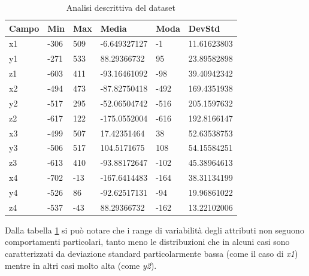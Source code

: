 \documentclass[12pt]{article}
\begin{document}
\begin{table}[h]
	\caption{Analisi descrittiva del dataset}\label{tab:analytics}
	\begin{tabular}{|l|l|l|l|l|l|}
		\hline
		Campo & Min & Max & Media & Moda & DevStd \\
		\hline
		x1 & -306 & 509 & -6.649327127 & -1 & 11.61623803 \\
		y1 & -271 & 533 & 88.29366732 & 95 & 23.89582898 \\
		z1 & -603 & 411 & -93.16461092 & -98 & 39.40942342 \\
		x2 & -494 & 473 & -87.82750418 & -492 & 169.4351938 \\
		y2 & -517 & 295 & -52.06504742 & -516 & 205.1597632 \\
		z2 & -617 & 122 & -175.0552004 & -616 & 192.8166147 \\
		x3 & -499 & 507 & 17.42351464 & 38 & 52.63538753 \\
		y3 & -506 & 517 & 104.5171675 & 108 & 54.15584251 \\
		z3 & -613 & 410 & -93.88172647 & -102 & 45.38964613 \\
		x4 & -702 & -13 & -167.6414483 & -164 & 38.31134199 \\
		y4 & -526 & 86 & -92.62517131 & -94 & 19.96861022 \\
		z4 & -537 & -43 & 88.29366732 & -162 & 13.22102006 \\
		
		\hline
	\end{tabular}
\end{table}

Dalla tabella \ref{tab:analytics} si può notare che i range di variabilità degli attributi non seguono comportamenti particolari, tanto meno le distribuzioni che in alcuni casi sono caratterizzati da deviazione standard particolarmente bassa (come il caso di \emph{x1}) mentre in altri casi molto alta (come \emph{y2}).
\end{document}
